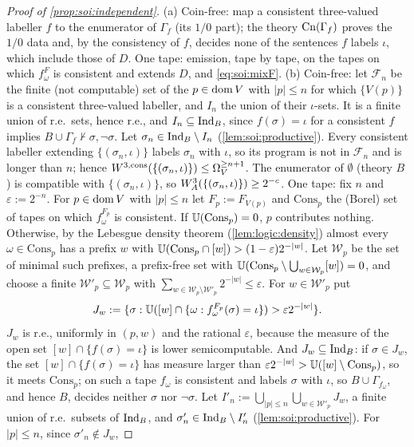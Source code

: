 \begin{proof}[Proof of \cref{prop:soi:independent}]
(a) Coin-free: map a consistent three-valued labeller $f$ to the enumerator of $\Gamma_f$ (its $1/0$ part); the theory $\mathrm{Cn}(\Gamma_f)$ proves the $1/0$ data and, by the consistency of $f$, decides none of the sentences $f$ labels $\iota$, which include those of $D$. One tape: emission, tape by tape, on the tapes on which $f^F_\omega$ is consistent and extends $D$, and \eqref{eq:soi:mixF}.
(b) Coin-free: let $\mathcal F_n$ be the finite (not computable) set of the $p\in\operatorname{dom} V$ with $\lvert p\rvert\le n$ for which $\{V(p)\}$ is a consistent three-valued labeller, and $I_n$ the union of their $\iota$-sets. It is a finite union of r.e.\ sets, hence r.e., and $I_n\subseteq\mathrm{Ind}_{B}$, since $f(\sigma)=\iota$ for a consistent $f$ implies $B\cup\Gamma_f\nvdash\sigma,\neg\sigma$. Let $\sigma_n\in\mathrm{Ind}_{B}\setminus I_n$ (\cref{lem:soi:productive}). Every consistent labeller extending $\{(\sigma_n,\iota)\}$ labels $\sigma_n$ with $\iota$, so its program is not in $\mathcal F_n$ and is longer than $n$; hence $W^{3,\mathrm{cons}}(\{(\sigma_n,\iota)\})\le\Omega_{V}^{\ge n+1}$. The enumerator of $\emptyset$ (theory $B$) is compatible with $\{(\sigma_n,\iota)\}$, so $W_{A}^{3}(\{(\sigma_n,\iota)\})\ge2^{-c}$.
One tape: fix $n$ and $\varepsilon:=2^{-n}$. For $p\in\operatorname{dom} V$ with $\lvert p\rvert\le n$ let $F_p:=F_{V(p)}$ and $\mathrm{Cons}_p$ the (Borel) set of tapes on which $f^{F_p}_\omega$ is consistent. If $\mathbb{U}(\mathrm{Cons}_p)=0$, $p$ contributes nothing. Otherwise, by the Lebesgue density theorem (\cref{lem:logic:density}) almost every $\omega\in\mathrm{Cons}_p$ has a prefix $w$ with $\mathbb{U}(\mathrm{Cons}_p\cap[w])>(1-\varepsilon)2^{-\lvert w\rvert}$. Let $\mathcal W_p$ be the set of minimal such prefixes, a prefix-free set with $\mathbb{U}(\mathrm{Cons}_p\setminus\bigcup_{w\in\mathcal W_p}[w])=0$, and choose a finite $\mathcal W'_p\subseteq\mathcal W_p$ with $\sum_{w\in\mathcal W_p\setminus\mathcal W'_p}2^{-\lvert w\rvert}\le\varepsilon$. For $w\in\mathcal W'_p$ put
\[
J_w:=\{\sigma:\mathbb{U}([w]\cap\{\omega:f^{F_p}_\omega(\sigma)=\iota\})>\varepsilon2^{-\lvert w\rvert}\}.
\]
$J_w$ is r.e., uniformly in $(p,w)$ and the rational $\varepsilon$, because the measure of the open set $[w]\cap\{f(\sigma)=\iota\}$ is lower semicomputable. And $J_w\subseteq\mathrm{Ind}_{B}$: if $\sigma\in J_w$, the set $[w]\cap\{f(\sigma)=\iota\}$ has measure larger than $\varepsilon2^{-\lvert w\rvert}>\mathbb{U}([w]\setminus\mathrm{Cons}_p)$, so it meets $\mathrm{Cons}_p$; on such a tape $f_\omega$ is consistent and labels $\sigma$ with $\iota$, so $B\cup\Gamma_{f_\omega}$, and hence $B$, decides neither $\sigma$ nor $\neg\sigma$. Let $I'_n:=\bigcup_{\lvert p\rvert\le n}\bigcup_{w\in\mathcal W'_p}J_w$, a finite union of r.e.\ subsets of $\mathrm{Ind}_{B}$, and $\sigma'_n\in\mathrm{Ind}_{B}\setminus I'_n$ (\cref{lem:soi:productive}). For $\lvert p\rvert\le n$, since $\sigma'_n\notin J_w$,

\end{proof}
